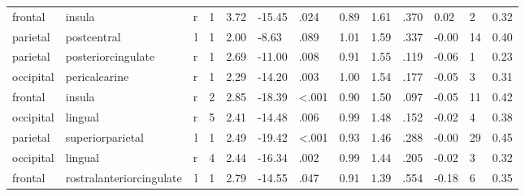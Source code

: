\documentclass{article}
\begin{document}
\begin{longtable}{llrR{1.3cm}R{1cm}R{1.3cm}R{1cm}R{1cm}R{1.3cm}R{1cm}R{1.8cm}R{1.3cm}R{1.8cm}}
   frontal &                    insula &    r &         1 &                  3.72 &           -15.45 &               .024 &                               0.89 &                          1.61 &                            .370 &   0.02 &      2 &      0.32 \\
  parietal &               postcentral &    l &         1 &                  2.00 &            -8.63 &               .089 &                               1.01 &                          1.59 &                            .337 &  -0.00 &     14 &      0.40 \\
  parietal &        posteriorcingulate &    r &         1 &                  2.69 &           -11.00 &               .008 &                               0.91 &                          1.55 &                            .119 &  -0.06 &      1 &      0.23 \\
 occipital &             pericalcarine &    r &         1 &                  2.29 &           -14.20 &               .003 &                               1.00 &                          1.54 &                            .177 &  -0.05 &      3 &      0.31 \\
   frontal &                    insula &    r &         2 &                  2.85 &           -18.39 &      \textless.001 &                               0.90 &                          1.50 &                            .097 &  -0.05 &     11 &      0.42 \\
 occipital &                   lingual &    r &         5 &                  2.41 &           -14.48 &               .006 &                               0.99 &                          1.48 &                            .152 &  -0.02 &      4 &      0.38 \\
  parietal &          superiorparietal &    l &         1 &                  2.49 &           -19.42 &      \textless.001 &                               0.93 &                          1.46 &                            .288 &  -0.00 &     29 &      0.45 \\
 occipital &                   lingual &    r &         4 &                  2.44 &           -16.34 &               .002 &                               0.99 &                          1.44 &                            .205 &  -0.02 &      3 &      0.32 \\
   frontal &  rostralanteriorcingulate &    l &         1 &                  2.79 &           -14.55 &               .047 &                               0.91 &                          1.39 &                            .554 &  -0.18 &      6 &      0.35 \\

\end{longtable}
\end{document}
